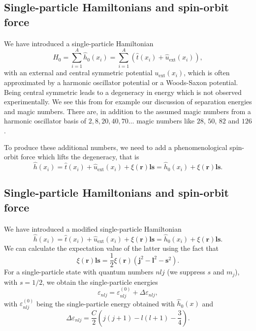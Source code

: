 \documentclass[%
twoside,                 %
final,                   %
10pt]{article}
\begin{document}
\subsection*{Single-particle Hamiltonians and spin-orbit force}

\paragraph{}
We have introduced a single-particle Hamiltonian
\[
  H_0=\sum_{i=1}^A \hat{h}_0(x_i) =  \sum_{i=1}^A\left(\hat{t}(x_i) + \hat{u}_{\mathrm{ext}}(x_i)\right),
\]
with an external and central symmetric potential $u_{\mathrm{ext}}(x_i)$, which is often 
approximated by a harmonic oscillator potential or a Woods-Saxon potential. Being central symmetric leads to a degeneracy 
in energy which is not observed experimentally. We see this from for example our discussion of separation energies and magic numbers. There are, in addition to the assumed magic numbers from a harmonic oscillator basis of $2,8,20,40,70\dots$ magic numbers like $28$, $50$, $82$ and $126$. 

To produce these additional numbers, we need to add a phenomenological spin-orbit force which lifts the degeneracy, that is
\[
\hat{h}(x_i) =  \hat{t}(x_i) + \hat{u}_{\mathrm{ext}}(x_i) +\xi(\bm{r})\bm{ls}=\hat{h}_0(x_i)+\xi(\bm{r})\bm{ls}. 
\]



\subsection*{Single-particle Hamiltonians and spin-orbit force}

\paragraph{}
We have introduced a modified single-particle Hamiltonian
\[
\hat{h}(x_i) =  \hat{t}(x_i) + \hat{u}_{\mathrm{ext}}(x_i) +\xi(\bm{r})\bm{ls}=\hat{h}_0(x_i)+\xi(\bm{r})\bm{ls}. 
\]
We can calculate the expectation value of the latter using the fact that
\[
\xi(\bm{r})\bm{ls}=\frac{1}{2}\xi(\bm{r})\left(\bm{j}^2-\bm{l}^2-\bm{s}^2\right).
\]
For a single-particle state with quantum numbers $nlj$ (we suppress $s$ and $m_j$), with $s=1/2$, we obtain the single-particle energies
\[
\varepsilon_{nlj} = \varepsilon_{nlj}^{(0)}+\Delta\varepsilon_{nlj}, 
\]
with $\varepsilon_{nlj}^{(0)}$ being the single-particle energy obtained with $\hat{h}_0(x)$ and
\[
\Delta\varepsilon_{nlj}=\frac{C}{2}\left(j(j+1)-l(l+1)-\frac{3}{4}\right).
\]
\end{document}
